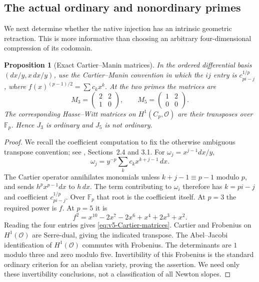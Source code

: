 \documentclass[11pt]{article}
\newtheorem{proposition}[proposition]{Proposition}
\theoremstyle{definition}
\theoremstyle{remark}
\newcommand{\F}{\mathbb F}
\begin{document}
\subsection{The actual ordinary and nonordinary primes}
We next determine whether the native injection has an intrinsic geometric
retraction. This is more informative than choosing an arbitrary
four-dimensional compression of its codomain.

\begin{proposition}[Exact Cartier--Manin matrices]
\label{prop:v5-Cartier}
In the ordered differential basis $(dx/y,x\,dx/y)$, use the Cartier--Manin
convention in which the $ij$ entry is $c_{pi-j}^{1/p}$, where
$f(x)^{(p-1)/2}=\sum c_kx^k$. At the two primes the matrices are
\begin{equation}
 \boxed{
 M_3=\begin{pmatrix}2&2\\1&0\end{pmatrix},\qquad
 M_5=\begin{pmatrix}1&2\\0&0\end{pmatrix}.}
 \label{eq:v5-Cartier-matrices}
\end{equation}
The corresponding Hasse--Witt matrices on $H^1(C_p,\mathcal O)$ are their
transposes over $\F_p$. Hence $J_3$ is ordinary and $J_5$ is not ordinary.
\end{proposition}
\begin{proof}
We recall the coefficient computation to fix the otherwise ambiguous
transpose convention; see \cite{AchterHowe}, Sections~2.4 and 3.1.
For $\omega_j=x^{j-1}dx/y$,
\[
 \omega_j=y^{-p}\sum_kc_kx^{k+j-1}\,dx.
\]
The Cartier operator annihilates monomials unless $k+j-1\equiv p-1$
modulo $p$, and sends
$h^px^{p-1}dx$ to $h\,dx$. The term contributing to $\omega_i$ therefore
has $k=pi-j$ and coefficient $c_{pi-j}^{1/p}$. Over $\F_p$ that root is
the coefficient itself. At $p=3$ the required power is $f$. At $p=5$ it is
\[
 f^2=x^{10}-2x^7-2x^6+x^4+2x^3+x^2.
\]
Reading the four entries gives \eqref{eq:v5-Cartier-matrices}. Cartier and
Frobenius on $H^1(\mathcal O)$ are Serre-dual, giving the indicated
transpose. The Abel--Jacobi identification of $H^1(\mathcal O)$ commutes
with Frobenius. The determinants are $1$ modulo three and zero modulo
five. Invertibility of this Frobenius is the standard ordinary criterion
for an abelian variety, proving the assertion. We need only these
invertibility conclusions, not a classification of all Newton slopes.
\end{proof}
\end{document}
